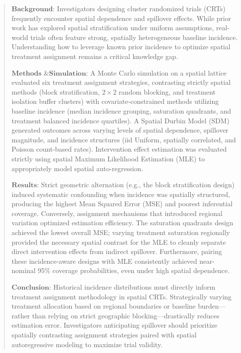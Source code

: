 \documentclass[11pt]{article} %
\newcommand{\keywords}[1]{%
  \noindent\textbf{Keywords:} #1%
}
\begin{document}

\vspace{1em} %

\begin{abstract}
   $\textbf{Background}$: Investigators designing cluster randomized trials (CRTs) frequently encounter spatial dependence and spillover effects. While prior work has explored spatial stratification under uniform assumptions, real-world trials often feature strong, spatially heterogeneous baseline incidence. Understanding how to leverage known prior incidence to optimize spatial treatment assignment remains a critical knowledge gap.

   $\textbf{Methods \& Simulation}$: A Monte Carlo simulation on a spatial lattice evaluated six treatment assignment strategies, contrasting strictly spatial methods (block stratification, $2\times 2$ random blocking, and treatment isolation buffer clusters) with covariate-constrained methods utilizing baseline incidence (median incidence grouping, saturation quadrants, and treatment balanced incidence quartiles). A Spatial Durbin Model (SDM) generated outcomes across varying levels of spatial dependence, spillover magnitude, and incidence structures (iid Uniform, spatially correlated, and Poisson count-based rates). Intervention effect estimation was evaluated strictly using spatial Maximum Likelihood Estimation (MLE) to appropriately model spatial auto-regression.

   $\textbf{Results}$: Strict geometric alternation (e.g., the block stratification design) induced systematic confounding when incidence was spatially structured, producing the highest Mean Squared Error (MSE) and poorest inferential coverage. Conversely, assignment mechanisms that introduced regional variation optimized estimation efficiency. The saturation quadrants design achieved the lowest overall MSE; varying treatment saturation regionally provided the necessary spatial contrast for the MLE to cleanly separate direct intervention effects from indirect spillover. Furthermore, pairing these incidence-aware designs with MLE consistently achieved near-nominal 95\% coverage probabilities, even under high spatial dependence.

   $\textbf{Conclusion}$: Historical incidence distributions must directly inform treatment assignment methodology in spatial CRTs. Strategically varying treatment allocation based on regional boundaries or baseline burden—rather than relying on strict geographic blocking—drastically reduces estimation error. Investigators anticipating spillover should prioritize spatially contrasting assignment strategies paired with spatial autoregressive modeling to maximize trial validity.
\end{abstract}
\end{document}
